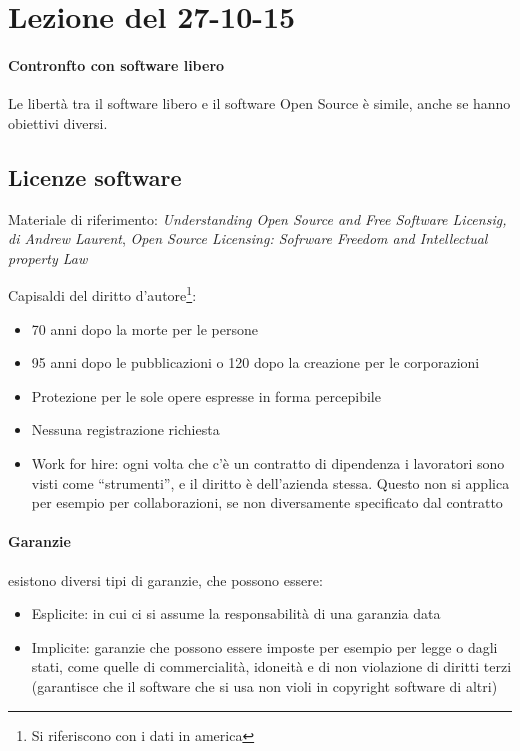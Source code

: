 \section{Lezione del 27-10-15}
\graphicspath{ {res/data/27-10-15/} }

\paragraph*{Contronfto con software libero} Le libert\`a tra il software libero e il software Open Source \`e simile, anche se hanno obiettivi diversi.

\subsection{Licenze software}

Materiale di riferimento: \textit{Understanding Open Source and Free Software Licensig, di Andrew Laurent}, \textit{Open Source Licensing: Sofrware Freedom and Intellectual property Law}

Capisaldi del diritto d'autore\footnote{Si riferiscono con i dati in america}:
\begin{itemize}
\item 70 anni dopo la morte per le persone
\item 95 anni dopo le pubblicazioni o 120 dopo la creazione per le corporazioni
\item Protezione per le sole opere espresse in forma percepibile
\item Nessuna registrazione richiesta
\item Work for hire: ogni volta che c'\`e un contratto di dipendenza i lavoratori sono visti come ``strumenti'', e il diritto \`e dell'azienda stessa. Questo non si applica per esempio per collaborazioni, se non diversamente specificato dal contratto
\end{itemize}

\paragraph*{Garanzie} esistono diversi tipi di garanzie, che possono essere:
\begin{itemize}
\item Esplicite: in cui ci si assume la responsabilit\`a di una garanzia data
\item Implicite: garanzie che possono essere imposte per esempio per legge o dagli stati, come quelle di commercialit\`a, idoneit\`a e di non violazione di diritti terzi (garantisce che il software che si usa non violi in copyright software di altri)
\end{itemize}

